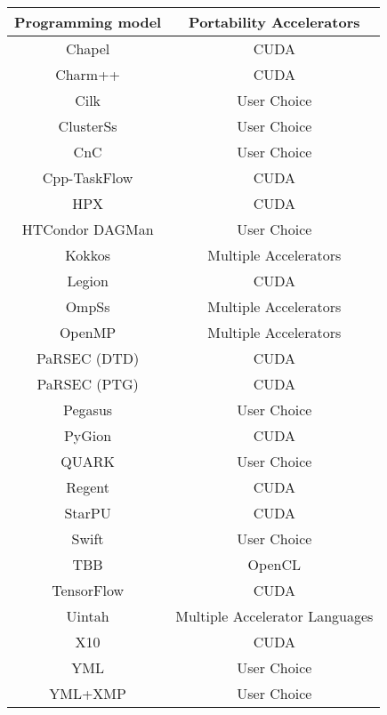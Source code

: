 \begin{tabular}{cc}
\hline
Programming model & Portability Accelerators \\
\hline
Chapel & CUDA\\
Charm++ & CUDA\\
Cilk & User Choice\\
ClusterSs & User Choice\\
CnC & User Choice\\
Cpp-TaskFlow & CUDA\\
HPX & CUDA\\
HTCondor DAGMan & User Choice\\
Kokkos & Multiple Accelerators\\
Legion & CUDA\\
OmpSs & Multiple Accelerators\\
OpenMP & Multiple Accelerators\\
PaRSEC (DTD) & CUDA\\
PaRSEC (PTG) & CUDA\\
Pegasus & User Choice\\
PyGion & CUDA\\
QUARK & User Choice\\
Regent & CUDA\\
StarPU & CUDA\\
Swift & User Choice\\
TBB & OpenCL\\
TensorFlow & CUDA\\
Uintah & Multiple Accelerator Languages\\
X10 & CUDA\\
YML & User Choice\\
YML+XMP & User Choice\\
\hline
\end{tabular}
